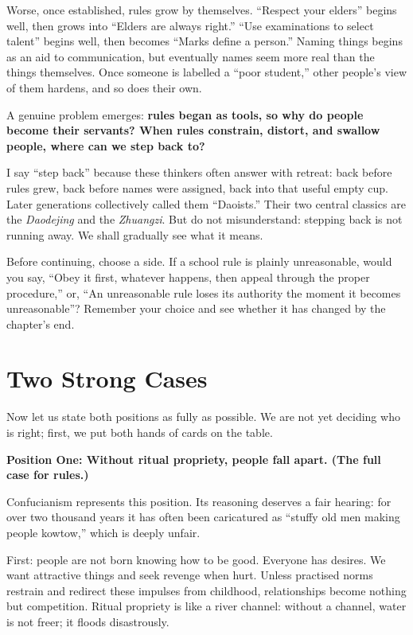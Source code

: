 Worse, once established, rules grow by themselves. ``Respect your elders'' begins well, then grows into ``Elders are always right.'' ``Use examinations to select talent'' begins well, then becomes ``Marks define a person.'' Naming things begins as an aid to communication, but eventually names seem more real than the things themselves. Once someone is labelled a ``poor student,'' other people's view of them hardens, and so does their own.

A genuine problem emerges: \textbf{rules began as tools, so why do people become their servants? When rules constrain, distort, and swallow people, where can we step back to?}

I say ``step back'' because these thinkers often answer with retreat: back before rules grew, back before names were assigned, back into that useful empty cup. Later generations collectively called them ``Daoists.'' Their two central classics are the \textit{Daodejing} and the \textit{Zhuangzi}. But do not misunderstand: stepping back is not running away. We shall gradually see what it means.

Before continuing, choose a side. If a school rule is plainly unreasonable, would you say, ``Obey it first, whatever happens, then appeal through the proper procedure,'' or, ``An unreasonable rule loses its authority the moment it becomes unreasonable''? Remember your choice and see whether it has changed by the chapter's end.

\section{Two Strong Cases}
Now let us state both positions as fully as possible. We are not yet deciding who is right; first, we put both hands of cards on the table.

\textbf{Position One: Without ritual propriety, people fall apart. (The full case for rules.)}

Confucianism represents this position. Its reasoning deserves a fair hearing: for over two thousand years it has often been caricatured as ``stuffy old men making people kowtow,'' which is deeply unfair.

First: people are not born knowing how to be good. Everyone has desires. We want attractive things and seek revenge when hurt. Unless practised norms restrain and redirect these impulses from childhood, relationships become nothing but competition. Ritual propriety is like a river channel: without a channel, water is not freer; it floods disastrously.

